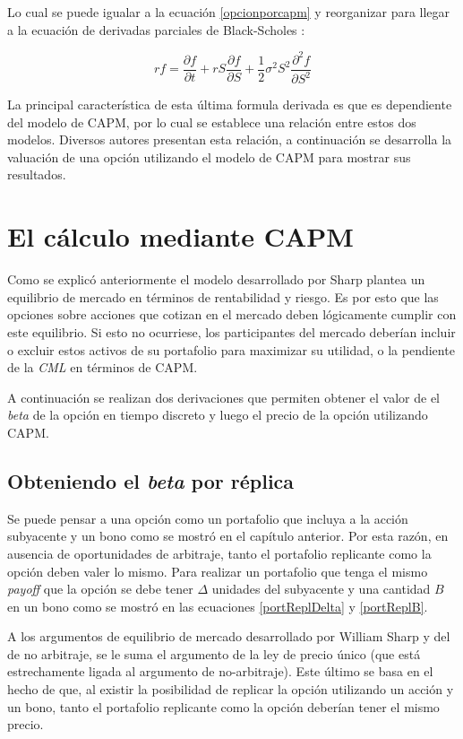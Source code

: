 Lo cual se puede igualar a la ecuación \eqref{opcionporcapm} y reorganizar para llegar a la ecuación de derivadas parciales de Black-Scholes \cite{frouah-formula}:

\begin{equation}
	r f = \frac{\partial f}{\partial t} + r S \frac{\partial f}{\partial S} +
		\frac{1}{2} \sigma^2 S^2 \frac{\partial^2 f}{\partial S^2}
\end{equation}

La principal característica de esta última formula derivada es que es dependiente del modelo de CAPM, por lo cual se establece una relación entre estos dos modelos. Diversos autores presentan esta relación, a continuación se desarrolla la valuación de una opción utilizando el modelo de CAPM para mostrar sus resultados.


\section{El cálculo mediante CAPM}

Como se explicó anteriormente el modelo desarrollado por Sharp plantea un equilibrio de mercado en términos de rentabilidad y riesgo. Es por esto que las opciones sobre acciones que cotizan en el mercado deben lógicamente cumplir con este equilibrio. Si esto no ocurriese, los participantes del mercado deberían incluir o excluir estos activos de su portafolio para maximizar su utilidad, o la pendiente de la \textit{CML} en términos de CAPM. 

A continuación se realizan dos derivaciones que permiten obtener el valor de el \textit{beta} de la opción en tiempo discreto y luego el precio de la opción utilizando CAPM.

\subsection{Obteniendo el \textit{beta} por réplica}

Se puede pensar a una opción como un portafolio que incluya a la acción subyacente y un bono como se mostró en el capítulo anterior. Por esta razón, en ausencia de oportunidades de arbitraje, tanto el portafolio replicante como la opción deben valer lo mismo. Para realizar un portafolio que tenga el mismo \textit{payoff} que la opción se debe tener $ \Delta $ unidades del subyacente y una cantidad $B$ en un bono como se mostró en las ecuaciones \eqref{portReplDelta} y \eqref{portReplB}.

A los argumentos de equilibrio de mercado desarrollado por William Sharp y del de no arbitraje, se le suma el argumento de la ley de precio único (que está estrechamente ligada al argumento de no-arbitraje). Este último se basa en el hecho de que, al existir la posibilidad de replicar la opción utilizando un acción y un bono, tanto el portafolio replicante como la opción deberían tener el mismo precio.


